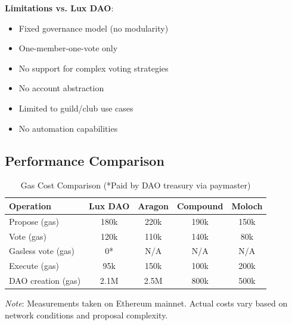 \textbf{Limitations vs. Lux DAO}:
\begin{itemize}
    \item Fixed governance model (no modularity)
    \item One-member-one-vote only
    \item No support for complex voting strategies
    \item No account abstraction
    \item Limited to guild/club use cases
    \item No automation capabilities
\end{itemize}

\subsection{Performance Comparison}

\begin{table}[h]
\centering
\begin{tabular}{|l|c|c|c|c|}
\hline
\textbf{Operation} & \textbf{Lux DAO} & \textbf{Aragon} & \textbf{Compound} & \textbf{Moloch} \\
\hline
Propose (gas) & 180k & 220k & 190k & 150k \\
Vote (gas) & 120k & 110k & 140k & 80k \\
Gasless vote (gas) & 0* & N/A & N/A & N/A \\
Execute (gas) & 95k & 150k & 100k & 200k \\
DAO creation (gas) & 2.1M & 2.5M & 800k & 500k \\
\hline
\end{tabular}
\caption{Gas Cost Comparison (*Paid by DAO treasury via paymaster)}
\end{table}

\textit{Note}: Measurements taken on Ethereum mainnet. Actual costs vary based on network conditions and proposal complexity.


